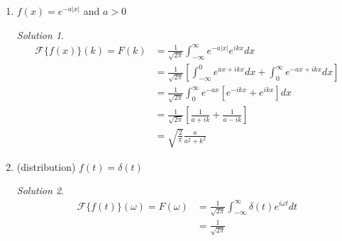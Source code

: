 \documentclass[10pt]{article}
\theoremstyle{definition}
\theoremstyle{remark}
\newtheorem*{solution}{Solution}
\begin{document}
\begin{enumerate}
\begin{enumerate}[label=\alph*.]
        \item $f(x) = e^{-a |x|}$ and $a>0$
        \begin{solution}
            \begin{align*}
                \mathcal F\{f(x)\}(k) = F(k) &= \frac{1}{\sqrt{2\pi}} \int_{-\infty}^\infty e^{-a|x|} e^{ikx} dx \\
                &= \frac{1}{\sqrt{2\pi}} \left[ \int_{-\infty}^0 e^{ax + i k x} dx + \int_0^\infty e^{-ax + ikx}dx \right] \\
                &= \frac{1}{\sqrt{2\pi}} \int_0^\infty e^{-ax} \left[ e^{-ikx} + e^{ikx} \right]dx \\
                &= \frac{1}{\sqrt{2\pi}} \left[ \frac{1}{a + ik} + \frac{1}{a - ik}\right] \\&= \sqrt{\frac{2}{\pi}} \frac{a}{a^2 + k^2}
            \end{align*}
        \end{solution}

        \item (distribution) $f(t) = \delta(t)$
        \begin{solution}
            \begin{align*}
                \mathcal F\{f(t)\}(\omega) = F(\omega) &= \frac{1}{\sqrt{2\pi}} \int_{-\infty}^\infty \delta(t) e^{i \omega t} dt \\
                &= \frac{1}{\sqrt{2\pi}}
            \end{align*}
        \end{solution}
    \end{enumerate}


\end{enumerate}
\end{document}
